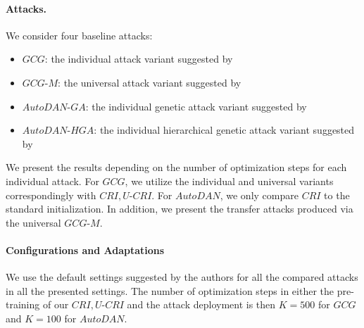 \paragraph{Attacks.}
We consider four baseline attacks:
\begin{itemize}
    \item $GCG$: the individual attack variant suggested by \citet{zou2023universal}
    \item $GCG\text{-}M$: the universal attack variant suggested by \citet{zou2023universal}
    \item $AutoDAN\text{-}GA$: the individual genetic attack variant suggested by \citet{liu2023autodan}
    \item $AutoDAN\text{-}HGA$: the individual hierarchical genetic attack variant suggested by \citet{liu2023autodan}
\end{itemize}
We present the results depending on the number of optimization steps for each individual attack. For $GCG$, we utilize the individual and universal variants correspondingly with $CRI,U\text{-}CRI$. For $AutoDAN$, we only compare $CRI$ to the standard initialization. In addition, we present the transfer attacks produced via the universal $GCG\text{-}M$. 

\paragraph{Configurations and Adaptations}
We use the default settings suggested by the authors for all the compared attacks in all the presented settings. The number of optimization steps in either the pre-training of our $CRI,U\text{-}CRI$ and the attack deployment is then $K=500$ for $GCG$ and $K=100$ for $AutoDAN$.





